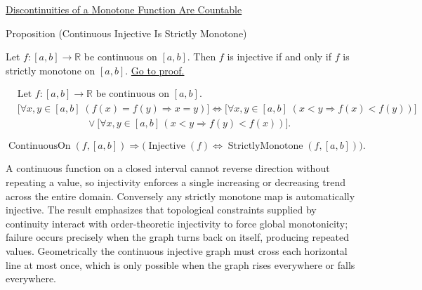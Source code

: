 \begin{remark*}[Dependencies]
\hyperref[thm:monotone-discontinuities-countable]{Discontinuities of a Monotone Function Are Countable}
\end{remark*}

\begin{propositionbox}{Proposition (Continuous Injective Is Strictly Monotone)}
\begin{proposition}
\label{prop:continuous-injective-iff-strictly-monotone}
Let $f:[a,b]\to\mathbb{R}$ be continuous on $[a,b]$. Then $f$ is injective if and only if $f$ is strictly monotone on $[a,b]$.
\hyperref[prf:continuous-injective-iff-strictly-monotone]{Go to proof.}
\end{proposition}
\end{propositionbox}

\begin{remark*}
\[
\begin{aligned}
&\text{Let } f:[a,b]\to\mathbb{R} \text{ be continuous on } [a,b].\\
&\bigl[\forall x,y\in[a,b]\;(f(x)=f(y)\Rightarrow x=y)\bigr] \Longleftrightarrow
\bigl[\forall x,y\in[a,b]\;(x<y\Rightarrow f(x)<f(y))\bigr]\\
&\qquad\qquad\qquad\quad\lor
\bigl[\forall x,y\in[a,b]\,(x<y\Rightarrow f(y)<f(x))\bigr].
\end{aligned}
\]
\end{remark*}

\begin{remark*}
\[
\operatorname{ContinuousOn}(f,[a,b]) \Longrightarrow
\bigl(\operatorname{Injective}(f) \Longleftrightarrow
\operatorname{StrictlyMonotone}(f,[a,b])\bigr).
\]
\end{remark*}

\begin{remark*}[Interpretation]
A continuous function on a closed interval cannot reverse direction without repeating a value, so injectivity enforces a single increasing or decreasing trend across the entire domain. Conversely any strictly monotone map is automatically injective. The result emphasizes that topological constraints supplied by continuity interact with order-theoretic injectivity to force global monotonicity; failure occurs precisely when the graph turns back on itself, producing repeated values. Geometrically the continuous injective graph must cross each horizontal line at most once, which is only possible when the graph rises everywhere or falls everywhere.
\end{remark*}

